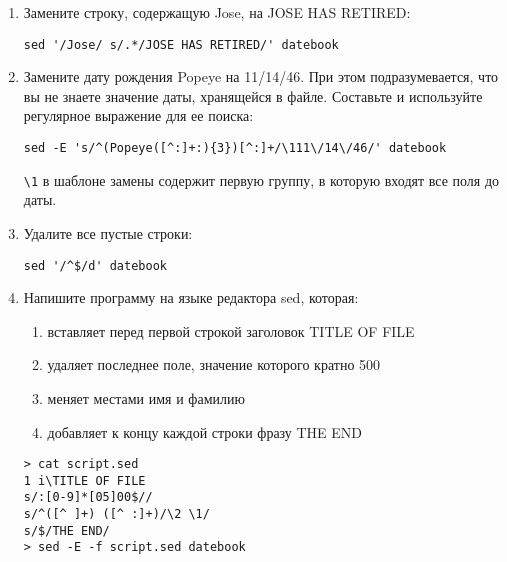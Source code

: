 \documentclass[listings]{labreport}
\begin{document}
\begin{enumerate}
\item Замените строку, содержащую Jose, на JOSE HAS RETIRED:
\begin{verbatim}
sed '/Jose/ s/.*/JOSE HAS RETIRED/' datebook
\end{verbatim}

\item Замените дату рождения Popeye на 11/14/46. При этом подразумевается, что вы не знаете значение даты, хранящейся в файле. Составьте и используйте регулярное выражение для ее поиска:
\begin{verbatim}
sed -E 's/^(Popeye([^:]+:){3})[^:]+/\111\/14\/46/' datebook
\end{verbatim}

\begin{small}
  \verb|\1| в шаблоне замены содержит первую группу, в которую входят все поля до даты.
\end{small}

\item Удалите все пустые строки:
\begin{verbatim}
sed '/^$/d' datebook
\end{verbatim}

\item Напишите программу на языке редактора sed, которая:
\begin{small}
\begin{enumerate}
\item вставляет перед первой строкой заголовок TITLE OF FILE
\item удаляет последнее поле, значение которого кратно 500
\item меняет местами имя и фамилию
\item добавляет к концу каждой строки фразу THE END
\end{enumerate}
\end{small}
\begin{verbatim}
> cat script.sed
1 i\TITLE OF FILE
s/:[0-9]*[05]00$//
s/^([^ ]+) ([^ :]+)/\2 \1/
s/$/THE END/
> sed -E -f script.sed datebook
\end{verbatim}

\end{enumerate}
\end{document}
